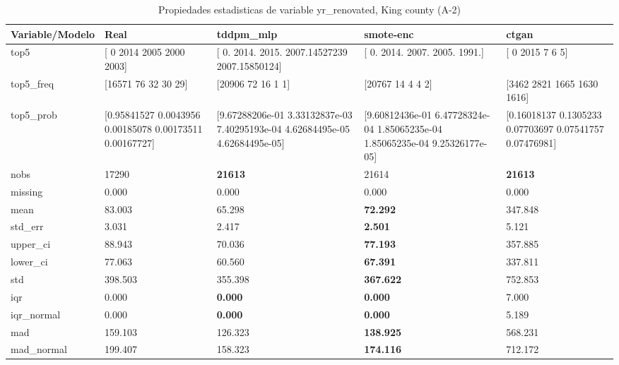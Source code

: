 \begin{table}[H]
\centering
\fontsize{8}{14}\selectfont
\caption{Propiedades  estadisticas de variable yr\_renovated, King county (A-2)}
\label{table-stats-king county-a-2-yr_renovated}
\begin{tabular}{|l|m{10em}|m{10em}|m{10em}|m{10em}|}
\hline
 \rowcolor[gray]{0.8}
Variable/Modelo & Real & tddpm\_mlp & smote-enc & ctgan \\
\hline top5 & [   0 2014 2005 2000 2003] & [   0.         2014.         2015.         2007.14527239 2007.15850124] & [   0. 2014. 2007. 2005. 1991.] & [   0 2015    7    6    5] \\
\hline top5\_freq & [16571    76    32    30    29] & [20906    72    16     1     1] & [20767    14     4     4     2] & [3462 2821 1665 1630 1616] \\
\hline top5\_prob & [0.95841527 0.0043956  0.00185078 0.00173511 0.00167727] & [9.67288206e-01 3.33132837e-03 7.40295193e-04 4.62684495e-05
 4.62684495e-05] & [9.60812436e-01 6.47728324e-04 1.85065235e-04 1.85065235e-04
 9.25326177e-05] & [0.16018137 0.1305233  0.07703697 0.07541757 0.07476981] \\
\hline nobs & 17290 & \bfseries 21613 & \cellcolor[rgb]{0.9, 0.54, 0.52} 21614 & \bfseries 21613 \\
\hline missing & 0.000 & 0.000 & 0.000 & 0.000 \\
\hline mean & 83.003 & 65.298 & \bfseries 72.292 & \cellcolor[rgb]{0.9, 0.54, 0.52} 347.848 \\
\hline std\_err & 3.031 & 2.417 & \bfseries 2.501 & \cellcolor[rgb]{0.9, 0.54, 0.52} 5.121 \\
\hline upper\_ci & 88.943 & 70.036 & \bfseries 77.193 & \cellcolor[rgb]{0.9, 0.54, 0.52} 357.885 \\
\hline lower\_ci & 77.063 & 60.560 & \bfseries 67.391 & \cellcolor[rgb]{0.9, 0.54, 0.52} 337.811 \\
\hline std & 398.503 & 355.398 & \bfseries 367.622 & \cellcolor[rgb]{0.9, 0.54, 0.52} 752.853 \\
\hline iqr & 0.000 & \bfseries 0.000 & \bfseries 0.000 & \cellcolor[rgb]{0.9, 0.54, 0.52} 7.000 \\
\hline iqr\_normal & 0.000 & \bfseries 0.000 & \bfseries 0.000 & \cellcolor[rgb]{0.9, 0.54, 0.52} 5.189 \\
\hline mad & 159.103 & 126.323 & \bfseries 138.925 & \cellcolor[rgb]{0.9, 0.54, 0.52} 568.231 \\
\hline mad\_normal & 199.407 & 158.323 & \bfseries 174.116 & \cellcolor[rgb]{0.9, 0.54, 0.52} 712.172 \\

\end{tabular}
\end{table}
